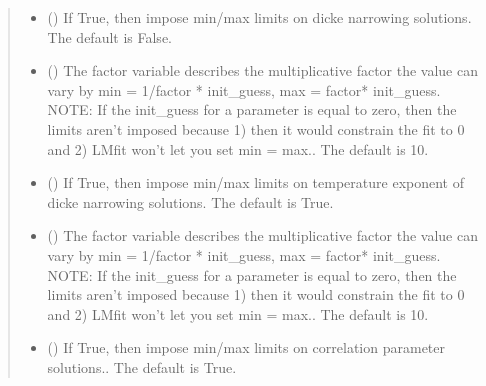 \documentclass[letterpaper,10pt,english]{sphinxmanual}
\begin{document}
\begin{fulllineitems}
\begin{quote}
\begin{description}
\begin{itemize}
\item {} 
\sphinxAtStartPar
{} (\sphinxstyleliteralemphasis{\sphinxupquote{, }}) \textendash{} If True, then impose min/max limits on dicke narrowing solutions. The default is False.

\item {} 
\sphinxAtStartPar
{} (\sphinxstyleliteralemphasis{\sphinxupquote{, }}) \textendash{} The factor variable describes the multiplicative factor the value can vary by min = 1/factor * init\_guess, max = factor* init\_guess. NOTE: If the init\_guess for a parameter is equal to zero, then the limits aren’t imposed because 1) then it would constrain the fit to 0 and 2) LMfit won’t let you set min = max.. The default is 10.

\item {} 
\sphinxAtStartPar
{} (\sphinxstyleliteralemphasis{\sphinxupquote{, }}) \textendash{} If True, then impose min/max limits on temperature exponent of dicke narrowing solutions. The default is True.

\item {} 
\sphinxAtStartPar
{} (\sphinxstyleliteralemphasis{\sphinxupquote{, }}) \textendash{} The factor variable describes the multiplicative factor the value can vary by min = 1/factor * init\_guess, max = factor* init\_guess. NOTE: If the init\_guess for a parameter is equal to zero, then the limits aren’t imposed because 1) then it would constrain the fit to 0 and 2) LMfit won’t let you set min = max.. The default is 10.

\item {} 
\sphinxAtStartPar
{} (\sphinxstyleliteralemphasis{\sphinxupquote{, }}) \textendash{} If True, then impose min/max limits on correlation parameter solutions.. The default is True.


\end{itemize}
\end{description}
\end{quote}
\end{fulllineitems}
\end{document}
